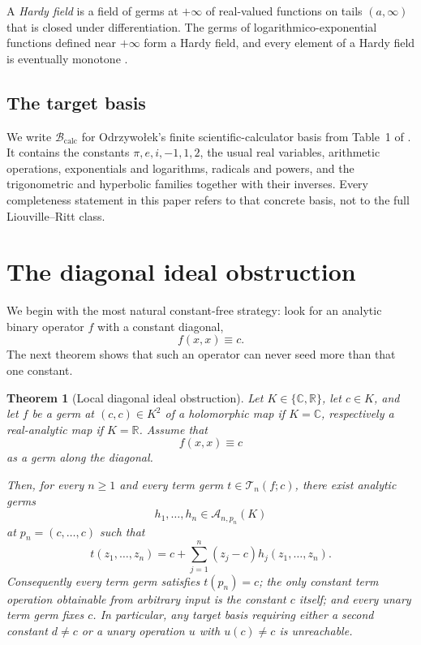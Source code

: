 \documentclass[12pt]{amsart}
\newtheorem{theorem}{Theorem}
\theoremstyle{remark}
\newcommand{\C}{\mathbb{C}}
\newcommand{\R}{\mathbb{R}}
\newcommand{\Term}{\mathcal{T}}
\begin{document}
A \emph{Hardy field} is a field of germs at $+\infty$ of real-valued functions on tails $(a,\infty)$ that is closed under differentiation.  The germs of logarithmico-exponential functions defined near $+\infty$ form a Hardy field, and every element of a Hardy field is eventually monotone \cite{Rosenlicht1983,AschenbrennerVanDenDriesVanDerHoeven2017}.

\subsection*{The target basis}
We write $\mathcal{B}_{\mathrm{calc}}$ for Odrzywo\l{}ek's finite scientific-calculator basis from Table~1 of \cite{Odrzywolek2026}.  It contains the constants $\pi,e,i,-1,1,2$, the usual real variables, arithmetic operations, exponentials and logarithms, radicals and powers, and the trigonometric and hyperbolic families together with their inverses.  Every completeness statement in this paper refers to that concrete basis, not to the full Liouville--Ritt class.

\section{The diagonal ideal obstruction}\label{sec:diagonal}

We begin with the most natural constant-free strategy: look for an analytic binary operator $f$ with a constant diagonal,
\[
f(x,x)\equiv c.
\]
The next theorem shows that such an operator can never seed more than that one constant.

\begin{theorem}[Local diagonal ideal obstruction]\label{thm:diagonal}
Let $K\in\{\C,\R\}$, let $c\in K$, and let $f$ be a germ at $(c,c)\in K^2$ of a holomorphic map if $K=\C$, respectively a real-analytic map if $K=\R$.  Assume that
\[
f(x,x)\equiv c
\]
as a germ along the diagonal.

Then, for every $n\geq 1$ and every term germ $t\in \Term_n(f;c)$, there exist analytic germs
\[
h_1,\dots,h_n\in \mathcal{A}_{n,p_n}(K)
\]
at $p_n=(c,\dots,c)$ such that
\begin{equation}\label{eq:diagonal-ideal}
t(z_1,\dots,z_n)=c+\sum_{j=1}^n (z_j-c)h_j(z_1,\dots,z_n).
\end{equation}
Consequently every term germ satisfies $t(p_n)=c$; the only constant term operation obtainable from arbitrary input is the constant $c$ itself; and every unary term germ fixes $c$.  In particular, any target basis requiring either a second constant $d\neq c$ or a unary operation $u$ with $u(c)\neq c$ is unreachable.
\end{theorem}
\end{document}
